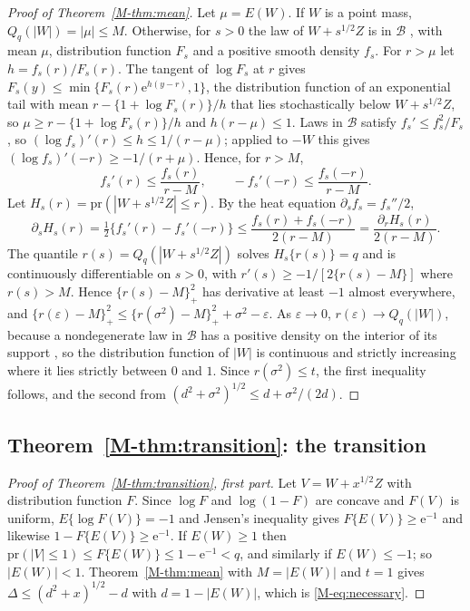 \documentclass[11pt]{article}
\renewcommand{\_}{\usc\allowbreak}
\newcommand{\pr}{\mathrm{pr}}
\begin{document}
\begin{proof}[Proof of Theorem~\ref{M-thm:mean}]
Let $\mu = E(W)$. If $W$ is a point mass, $Q_q(|W|) = |\mu| \le M$. Otherwise, for $s > 0$ the law of $W + s^{1/2}Z$ is in $\mathcal B$ \citep{saumard2019}, with mean $\mu$, distribution function $F_s$ and a positive smooth density $f_s$. For $r > \mu$ let $h = f_s(r)/F_s(r)$. The tangent of $\log F_s$ at $r$ gives $F_s(y) \le \min\{F_s(r)\mathrm{e}^{h(y - r)}, 1\}$, the distribution function of an exponential tail with mean $r - \{1 + \log F_s(r)\}/h$ that lies stochastically below $W + s^{1/2}Z$, so $\mu \ge r - \{1 + \log F_s(r)\}/h$ and $h(r - \mu) \le 1$. Laws in $\mathcal B$ satisfy $f_s' \le f_s^2/F_s$ \citep{dumbgen2017}, so $(\log f_s)'(r) \le h \le 1/(r - \mu)$; applied to $-W$ this gives $(\log f_s)'(-r) \ge -1/(r + \mu)$. Hence, for $r > M$,
\[
f_s'(r) \le \frac{f_s(r)}{r - M}, \qquad -f_s'(-r) \le \frac{f_s(-r)}{r - M}.
\]
Let $H_s(r) = \pr(|W + s^{1/2}Z| \le r)$. By the heat equation $\partial_s f_s = f_s''/2$,
\[
\partial_s H_s(r) = \tfrac12\{f_s'(r) - f_s'(-r)\} \le \frac{f_s(r) + f_s(-r)}{2(r - M)} = \frac{\partial_r H_s(r)}{2(r - M)}.
\]
The quantile $r(s) = Q_q(|W + s^{1/2}Z|)$ solves $H_s\{r(s)\} = q$ and is continuously differentiable on $s > 0$, with $r'(s) \ge -1/[2\{r(s) - M\}]$ where $r(s) > M$. Hence $\{r(s) - M\}_+^2$ has derivative at least $-1$ almost everywhere, and $\{r(\varepsilon) - M\}_+^2 \le \{r(\sigma^2) - M\}_+^2 + \sigma^2 - \varepsilon$. As $\varepsilon \to 0$, $r(\varepsilon) \to Q_q(|W|)$, because a nondegenerate law in $\mathcal B$ has a positive density on the interior of its support \citep{dumbgen2017}, so the distribution function of $|W|$ is continuous and strictly increasing where it lies strictly between $0$ and $1$. Since $r(\sigma^2) \le t$, the first inequality follows, and the second from $(d^2 + \sigma^2)^{1/2} \le d + \sigma^2/(2d)$.
\end{proof}

\subsection*{Theorem~\ref{M-thm:transition}: the transition}

\begin{proof}[Proof of Theorem~\ref{M-thm:transition}, first part]
Let $V = W + x^{1/2}Z$ with distribution function $F$. Since $\log F$ and $\log(1 - F)$ are concave and $F(V)$ is uniform, $E\{\log F(V)\} = -1$ and Jensen's inequality gives $F\{E(V)\} \ge \mathrm{e}^{-1}$ and likewise $1 - F\{E(V)\} \ge \mathrm{e}^{-1}$. If $E(W) \ge 1$ then $\pr(|V| \le 1) \le F\{E(W)\} \le 1 - \mathrm{e}^{-1} < q$, and similarly if $E(W) \le -1$; so $|E(W)| < 1$. Theorem~\ref{M-thm:mean} with $M = |E(W)|$ and $t = 1$ gives $\Delta \le (d^2 + x)^{1/2} - d$ with $d = 1 - |E(W)|$, which is \eqref{M-eq:necessary}.
\end{proof}
\end{document}
